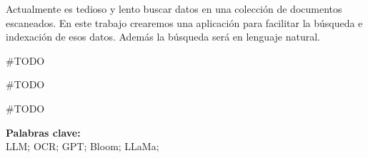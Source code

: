 \documentclass[../main.tex]{subfiles}
\begin{document}

Actualmente es tedioso y lento buscar datos en una colección de documentos escaneados.
En este trabajo crearemos una aplicación para facilitar la búsqueda e indexación de esos datos.
Además la búsqueda será en lenguaje natural.

\#TODO

\#TODO

\#TODO

%
%

\noindent \textbf{Palabras clave:}\\
\noindent LLM; OCR; GPT; Bloom; LLaMa;
\end{document}
